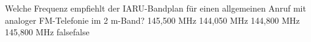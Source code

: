     {Welche Frequenz empfiehlt der IARU-Bandplan für einen allgemeinen Anruf mit analoger FM-Telefonie im 2 m-Band?}
    {145,500 MHz}
    {144,050 MHz}
    {144,800 MHz}
    {145,800 MHz}
    {false}{false}